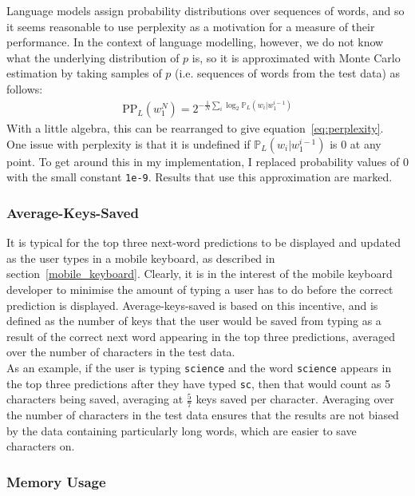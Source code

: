 \documentclass[a4paper, 12pt]{report}
\newcommand{\ttt}[1]{\texttt{#1}}
\begin{document}
Language models assign probability distributions over sequences of words, and so it seems reasonable to use perplexity as a motivation for a measure of their performance. In the context of language modelling, however, we do not know what the underlying distribution of $p$ is, so it is approximated with Monte Carlo estimation by taking samples of $p$ (i.e. sequences of words from the test data) as follows:
\begin{gather*}
	\text{PP}_L(w_1^N) = 2^{-\frac{1}{N}\sum_i \log_2 \mathbb{P}_L(w_i | w_1^{i-1})}
\end{gather*}
With a little algebra, this can be rearranged to give equation~\ref{eq:perplexity}. \\

One issue with perplexity is that it is undefined if $\mathbb{P}_L(w_i | w_1^{i-1})$ is 0 at any point. To get around this in my implementation, I replaced probability values of 0 with the small constant \ttt{1e-9}. Results that use this approximation are marked.

\subsubsection{Average-Keys-Saved}

It is typical for the top three next-word predictions to be displayed and updated as the user types in a mobile keyboard, as described in section~\ref{mobile_keyboard}. Clearly, it is in the interest of the mobile keyboard developer to minimise the amount of typing a user has to do before the correct prediction is displayed. Average-keys-saved is based on this incentive, and is defined as the number of keys that the user would be saved from typing as a result of the correct next word appearing in the top three predictions, averaged over the number of characters in the test data. \\

As an example, if the user is typing \ttt{science} and the word \ttt{science} appears in the top three predictions after they have typed \ttt{sc}, then that would count as 5 characters being saved, averaging at $\frac{5}{7}$ keys saved per character. Averaging over the number of characters in the test data ensures that the results are not biased by the data containing particularly long words, which are easier to save characters on.

\subsubsection{Memory Usage}
\end{document}
